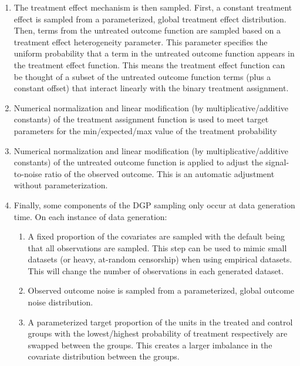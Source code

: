 \documentclass[../main.tex]{subfiles}
\begin{document}
\begin{enumerate}
    \item The treatment effect mechanism is then sampled. First, a constant treatment effect is sampled from a parameterized, global treatment effect distribution. Then, terms from the untreated outcome function are sampled based on a treatment effect heterogeneity parameter. This parameter specifies the uniform probability that a term in the untreated outcome function appears in the treatment effect function. This means the treatment effect function can be thought of a subset of the untreated outcome function terms (plus a constant offset) that interact linearly with the binary treatment assignment.

    \item Numerical normalization and linear modification (by multiplicative/additive constants) of the treatment assignment function is used to meet target parameters for the min/expected/max value of the treatment probability

    \item Numerical normalization and linear modification (by multiplicative/additive constants) of the untreated outcome function is applied to adjust the signal-to-noise ratio of the observed outcome. This is an automatic adjustment without parameterization.

    \item Finally, some components of the DGP sampling only occur at data generation time. On each instance of data generation:

    \begin{enumerate}
        \item A fixed proportion of the covariates are sampled with the default being that all observations are sampled. This step can be used to mimic small datasets (or heavy, at-random censorship) when using empirical datasets. This will change the number of observations in each generated dataset.
        \item Observed outcome noise is sampled from a parameterized, global outcome noise distribution.
        \item A parameterized target proportion of the units in the treated and control groups with the lowest/highest probability of treatment respectively are swapped between the groups. This creates a larger imbalance in the covariate distribution between the groups.
    \end{enumerate}

\end{enumerate}
\end{document}
